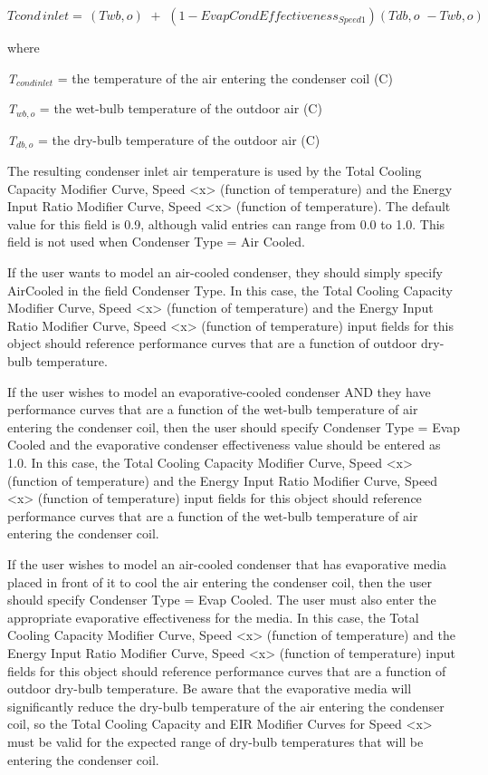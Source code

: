 \begin{equation}
Tcond\,inlet = \,\left( {Twb,o} \right)\,\, + \,\,\left( {1 - EvapCondEffectivenes{s_{Speed1}}} \right)\left( {Tdb,o\,\, - Twb,o} \right)
\end{equation}

where

\emph{T\(_{cond inlet}\)} = the temperature of the air entering the condenser coil (C)

\emph{T\(_{wb,o}\)} = the wet-bulb temperature of the outdoor air (C)

\emph{T\(_{db,o}\)} = the dry-bulb temperature of the outdoor air (C)

The resulting condenser inlet air temperature is used by the Total Cooling Capacity Modifier Curve, Speed \textless{}x\textgreater{} (function of temperature) and the Energy Input Ratio Modifier Curve, Speed \textless{}x\textgreater{} (function of temperature). The default value for this field is 0.9, although valid entries can range from 0.0 to 1.0. This field is not used when Condenser Type = Air Cooled.

If the user wants to model an air-cooled condenser, they should simply specify AirCooled in the field Condenser Type. In this case, the Total Cooling Capacity Modifier Curve, Speed \textless{}x\textgreater{} (function of temperature) and the Energy Input Ratio Modifier Curve, Speed \textless{}x\textgreater{} (function of temperature) input fields for this object should reference performance curves that are a function of outdoor dry-bulb temperature.

If the user wishes to model an evaporative-cooled condenser AND they have performance curves that are a function of the wet-bulb temperature of air entering the condenser coil, then the user should specify Condenser Type = Evap Cooled and the evaporative condenser effectiveness value should be entered as 1.0. In this case, the Total Cooling Capacity Modifier Curve, Speed \textless{}x\textgreater{} (function of temperature) and the Energy Input Ratio Modifier Curve, Speed \textless{}x\textgreater{} (function of temperature) input fields for this object should reference performance curves that are a function of the wet-bulb temperature of air entering the condenser coil.

If the user wishes to model an air-cooled condenser that has evaporative media placed in front of it to cool the air entering the condenser coil, then the user should specify Condenser Type = Evap Cooled. The user must also enter the appropriate evaporative effectiveness for the media. In this case, the Total Cooling Capacity Modifier Curve, Speed \textless{}x\textgreater{} (function of temperature) and the Energy Input Ratio Modifier Curve, Speed \textless{}x\textgreater{} (function of temperature) input fields for this object should reference performance curves that are a function of outdoor dry-bulb temperature. Be aware that the evaporative media will significantly reduce the dry-bulb temperature of the air entering the condenser coil, so the Total Cooling Capacity and EIR Modifier Curves for Speed \textless{}x\textgreater{} must be valid for the expected range of dry-bulb temperatures that will be entering the condenser coil.

